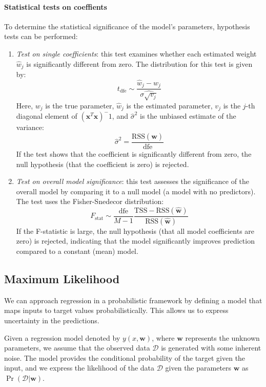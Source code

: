 \paragraph*{Statistical tests on coeffients}
To determine the statistical significance of the model's parameters, hypothesis tests can be performed:
\begin{enumerate}
    \item \textit{Test on single coefficients}: this test examines whether each estimated weight $\hat{w}_j$ is significantly different from zero.
        The distribution for this test is given by:
        \[t_{\text{dfe}}\sim\dfrac{\hat{w}_j-w_j}{\hat{\sigma\sqrt{v_j}}}\]
        Here, $w_j$ is the true parameter, $\hat{w}_j$ is the estimated parameter, $v_j$ is the $j$-th diagonal element of $(\mathbf{x}^T\mathbf{x})^-1$, and $\hat{\sigma}^2$ is the unbiased estimate of the variance:
        \[\hat{\sigma}^2=\dfrac{\text{RSS}(\hat{\mathbf{w}})}{\text{dfe}}\]
        If the test shows that the coefficient is significantly different from zero, the null hypothesis (that the coefficient is zero) is rejected.
    \item \textit{Test on overall model significance}: this test assesses the significance of the overall model by comparing it to a null model (a model with no predictors).
        The test uses the Fisher-Snedecor distribution:
        \[F_\text{stat}\sim\dfrac{\text{dfe}}{M-1}\dfrac{\text{TSS}-\text{RSS}(\hat{\mathbf{w}})}{\text{RSS}(\hat{\mathbf{w}})}\]  
        If the F-statistic is large, the null hypothesis (that all model coefficients are zero) is rejected, indicating that the model significantly improves prediction compared to a constant (mean) model.
\end{enumerate}

\subsection{Maximum Likelihood}
We can approach regression in a probabilistic framework by defining a model that maps inputs to target values probabilistically. This allows us to express uncertainty in the predictions.

Given a regression model denoted by $y(x, \mathbf{w})$, where $\mathbf{w}$ represents the unknown parameters, we assume that the observed data $\mathcal{D}$ is generated with some inherent noise.
The model provides the conditional probability of the target given the input, and we express the likelihood of the data $\mathcal{D}$ given the parameters $\mathbf{w}$ as $\Pr(\mathcal{D}|\mathbf{w})$. 

